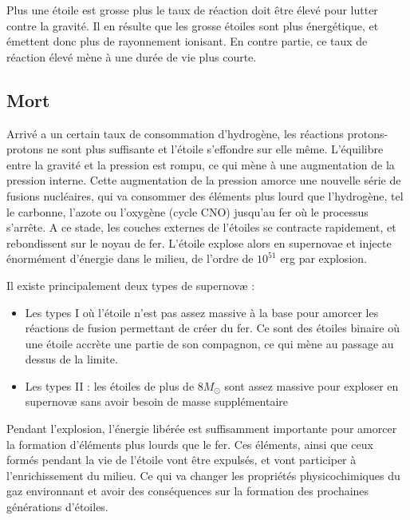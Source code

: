 Plus une étoile est grosse plus le taux de réaction doit être élevé pour lutter contre la gravité.
Il en résulte que les grosse étoiles sont plus énergétique, et émettent donc plus de rayonnement ionisant.
En contre partie, ce taux de réaction élevé mène à une durée de vie plus courte.


\subsection{Mort}

Arrivé a un certain taux de consommation d'hydrogène, les réactions protons-protons ne sont plus suffisante et l'étoile s'effondre sur elle même.
L'équilibre entre la gravité et la pression est rompu, ce qui mène à une augmentation de la pression interne.
Cette augmentation de la pression amorce une nouvelle série de fusions nucléaires, qui va consommer des éléments plus lourd que l’hydrogène, tel le carbonne, l'azote ou l'oxygène (cycle CNO) jusqu'au fer où le processus s'arrête.
A ce stade, les couches externes de l'étoiles se contracte rapidement, et rebondissent sur le noyau de fer.
L'étoile explose alors en supernovae et injecte énormément d'énergie dans le milieu, de l'ordre de $10^{51}$ erg par explosion. 

Il existe principalement deux types de supernovæ : 
\begin{itemize}
\item Les types I où l'étoile n'est pas assez massive à la base pour amorcer les réactions de fusion permettant de créer du fer.
Ce sont des étoiles binaire où une étoile accrète une partie de son compagnon, ce qui mène au passage au dessus de la limite.
\item Les types II : les étoiles de plus de 8$M_\odot$  sont assez massive pour exploser en supernovæ sans avoir besoin de masse supplémentaire
\end{itemize}

Pendant l'explosion, l'énergie libérée est suffisamment importante pour amorcer la formation d'éléments plus lourds que le fer.
Ces éléments, ainsi que ceux formés pendant la vie de l'étoile vont être expulsés, et vont participer à l'enrichissement du milieu.
Ce qui va changer les propriétés physicochimiques du gaz environnant et avoir des conséquences sur la formation des prochaines générations d'étoiles.

